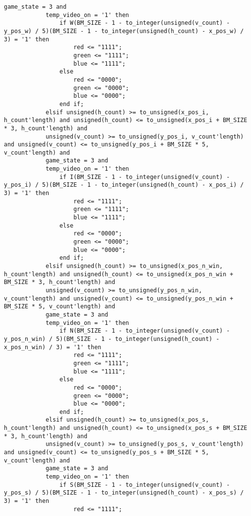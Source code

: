 \documentclass{article}
\begin{document}
\begin{lstlisting}[caption=Draw Process, label=lst:draw-process]
            game_state = 3 and
            temp_video_on = '1' then
                if W(BM_SIZE - 1 - to_integer(unsigned(v_count) - y_pos_w) / 5)(BM_SIZE - 1 - to_integer(unsigned(h_count) - x_pos_w) / 3) = '1' then
                    red <= "1111";
                    green <= "1111";
                    blue <= "1111";
                else
                    red <= "0000";
                    green <= "0000";
                    blue <= "0000";
                end if;
            elsif unsigned(h_count) >= to_unsigned(x_pos_i, h_count'length) and unsigned(h_count) <= to_unsigned(x_pos_i + BM_SIZE * 3, h_count'length) and
            unsigned(v_count) >= to_unsigned(y_pos_i, v_count'length) and unsigned(v_count) <= to_unsigned(y_pos_i + BM_SIZE * 5, v_count'length) and
            game_state = 3 and
            temp_video_on = '1' then
                if I(BM_SIZE - 1 - to_integer(unsigned(v_count) - y_pos_i) / 5)(BM_SIZE - 1 - to_integer(unsigned(h_count) - x_pos_i) / 3) = '1' then
                    red <= "1111";
                    green <= "1111";
                    blue <= "1111";
                else
                    red <= "0000";
                    green <= "0000";
                    blue <= "0000";
                end if;
            elsif unsigned(h_count) >= to_unsigned(x_pos_n_win, h_count'length) and unsigned(h_count) <= to_unsigned(x_pos_n_win + BM_SIZE * 3, h_count'length) and
            unsigned(v_count) >= to_unsigned(y_pos_n_win, v_count'length) and unsigned(v_count) <= to_unsigned(y_pos_n_win + BM_SIZE * 5, v_count'length) and
            game_state = 3 and
            temp_video_on = '1' then
                if N(BM_SIZE - 1 - to_integer(unsigned(v_count) - y_pos_n_win) / 5)(BM_SIZE - 1 - to_integer(unsigned(h_count) - x_pos_n_win) / 3) = '1' then
                    red <= "1111";
                    green <= "1111";
                    blue <= "1111";
                else
                    red <= "0000";
                    green <= "0000";
                    blue <= "0000";
                end if;
            elsif unsigned(h_count) >= to_unsigned(x_pos_s, h_count'length) and unsigned(h_count) <= to_unsigned(x_pos_s + BM_SIZE * 3, h_count'length) and
            unsigned(v_count) >= to_unsigned(y_pos_s, v_count'length) and unsigned(v_count) <= to_unsigned(y_pos_s + BM_SIZE * 5, v_count'length) and
            game_state = 3 and
            temp_video_on = '1' then
                if S(BM_SIZE - 1 - to_integer(unsigned(v_count) - y_pos_s) / 5)(BM_SIZE - 1 - to_integer(unsigned(h_count) - x_pos_s) / 3) = '1' then
                    red <= "1111";

\end{lstlisting}
\end{document}

